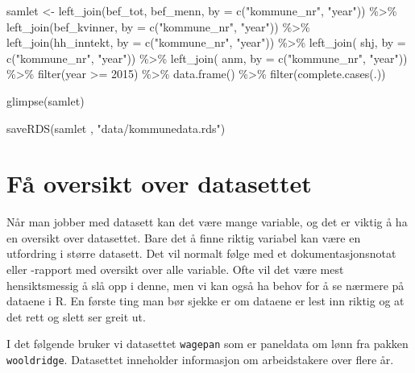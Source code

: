 \documentclass[
  norsk,
  letterpaper,
  DIV=11,
  numbers=noendperiod]{scrreprt}
\newenvironment{Shaded}{\begin{snugshade}}{\end{snugshade}}
\newcommand{\AttributeTok}[1]{\textcolor[rgb]{0.40,0.45,0.13}{#1}}
\newcommand{\DecValTok}[1]{\textcolor[rgb]{0.68,0.00,0.00}{#1}}
\newcommand{\FunctionTok}[1]{\textcolor[rgb]{0.28,0.35,0.67}{#1}}
\newcommand{\NormalTok}[1]{\textcolor[rgb]{0.00,0.23,0.31}{#1}}
\newcommand{\OtherTok}[1]{\textcolor[rgb]{0.00,0.23,0.31}{#1}}
\newcommand{\SpecialCharTok}[1]{\textcolor[rgb]{0.37,0.37,0.37}{#1}}
\newcommand{\StringTok}[1]{\textcolor[rgb]{0.13,0.47,0.30}{#1}}
\theoremstyle{definition}
\theoremstyle{remark}
\begin{document}
\begin{Shaded}
\begin{Highlighting}[]
\NormalTok{samlet }\OtherTok{\textless{}{-}} \FunctionTok{left\_join}\NormalTok{(bef\_tot, bef\_menn, }\AttributeTok{by =} \FunctionTok{c}\NormalTok{(}\StringTok{"kommune\_nr"}\NormalTok{, }\StringTok{"year"}\NormalTok{)) }\SpecialCharTok{\%\textgreater{}\%} 
  \FunctionTok{left\_join}\NormalTok{(bef\_kvinner, }\AttributeTok{by =} \FunctionTok{c}\NormalTok{(}\StringTok{"kommune\_nr"}\NormalTok{, }\StringTok{"year"}\NormalTok{)) }\SpecialCharTok{\%\textgreater{}\%} 
  \FunctionTok{left\_join}\NormalTok{(hh\_inntekt, }\AttributeTok{by =} \FunctionTok{c}\NormalTok{(}\StringTok{"kommune\_nr"}\NormalTok{, }\StringTok{"year"}\NormalTok{)) }\SpecialCharTok{\%\textgreater{}\%} 
  \FunctionTok{left\_join}\NormalTok{( shj, }\AttributeTok{by =} \FunctionTok{c}\NormalTok{(}\StringTok{"kommune\_nr"}\NormalTok{, }\StringTok{"year"}\NormalTok{)) }\SpecialCharTok{\%\textgreater{}\%} 
  \FunctionTok{left\_join}\NormalTok{( anm, }\AttributeTok{by =} \FunctionTok{c}\NormalTok{(}\StringTok{"kommune\_nr"}\NormalTok{, }\StringTok{"year"}\NormalTok{)) }\SpecialCharTok{\%\textgreater{}\%} 
  \FunctionTok{filter}\NormalTok{(year }\SpecialCharTok{\textgreater{}=} \DecValTok{2015}\NormalTok{) }\SpecialCharTok{\%\textgreater{}\%} 
  \FunctionTok{data.frame}\NormalTok{() }\SpecialCharTok{\%\textgreater{}\%} 
  \FunctionTok{filter}\NormalTok{(}\FunctionTok{complete.cases}\NormalTok{(.)) }

\FunctionTok{glimpse}\NormalTok{(samlet)}
  

\FunctionTok{saveRDS}\NormalTok{(samlet , }\StringTok{"data/kommunedata.rds"}\NormalTok{)}
\end{Highlighting}
\end{Shaded}

\chapter{Få oversikt over
datasettet}\label{fuxe5-oversikt-over-datasettet}

Når man jobber med datasett kan det være mange variable, og det er
viktig å ha en oversikt over datasettet. Bare det å finne riktig
variabel kan være en utfordring i større datasett. Det vil normalt følge
med et dokumentasjonsnotat eller -rapport med oversikt over alle
variable. Ofte vil det være mest hensiktsmessig å slå opp i denne, men
vi kan også ha behov for å se nærmere på dataene i R. En første ting man
bør sjekke er om dataene er lest inn riktig og at det rett og slett ser
greit ut.

I det følgende bruker vi datasettet \texttt{wagepan} som er paneldata om
lønn fra pakken \texttt{wooldridge}. Datasettet inneholder informasjon
om arbeidstakere over flere år.
\end{document}
